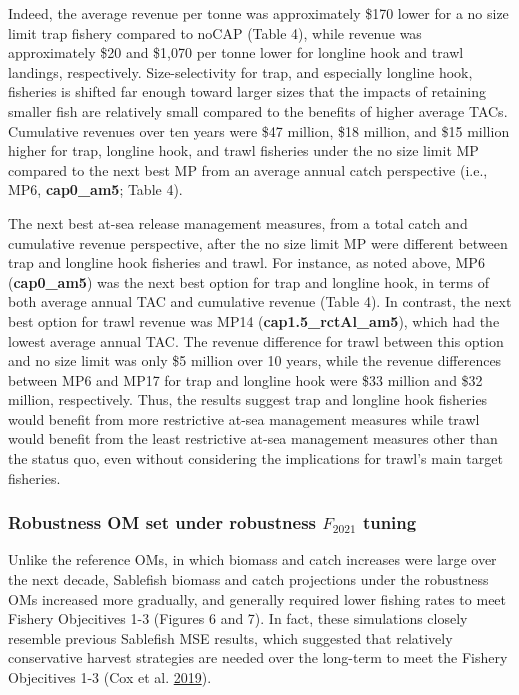 \documentclass[11pt]{book}
\begin{document}
Indeed, the average revenue per tonne was approximately \$170 lower for a no size limit trap fishery compared to noCAP (Table 4), while revenue was approximately \$20 and \$1,070 per tonne lower for longline hook and trawl landings, respectively. Size-selectivity for trap, and especially longline hook, fisheries is shifted far enough toward larger sizes that the impacts of retaining smaller fish are relatively small compared to the benefits of higher average TACs. Cumulative revenues over ten years were \$47 million, \$18 million, and \$15 million higher for trap, longline hook, and trawl fisheries under the no size limit MP compared to the next best MP from an average annual catch perspective (i.e., MP6, \textbf{cap0\_am5}; Table 4).

The next best at-sea release management measures, from a total catch and cumulative revenue perspective, after the no size limit MP were different between trap and longline hook fisheries and trawl. For instance, as noted above, MP6 (\textbf{cap0\_am5}) was the next best option for trap and longline hook, in terms of both average annual TAC and cumulative revenue (Table 4). In contrast, the next best option for trawl revenue was MP14 (\textbf{cap1.5\_rctAl\_am5}), which had the lowest average annual TAC. The revenue difference for trawl between this option and no size limit was only \$5 million over 10 years, while the revenue differences between MP6 and MP17 for trap and longline hook were \$33 million and \$32 million, respectively. Thus, the results suggest trap and longline hook fisheries would benefit from more restrictive at-sea management measures while trawl would benefit from the least restrictive at-sea management measures other than the status quo, even without considering the implications for trawl's main target fisheries.

\hypertarget{robustness-om-set-under-robustness-f_2021-tuning}{%
\subsubsection{\texorpdfstring{Robustness OM set under robustness \(F_{2021}\) tuning}{Robustness OM set under robustness F\_\{2021\} tuning}}\label{robustness-om-set-under-robustness-f_2021-tuning}}

Unlike the reference OMs, in which biomass and catch increases were large over the next decade, Sablefish biomass and catch projections under the robustness OMs increased more gradually, and generally required lower fishing rates to meet Fishery Objecitives 1-3 (Figures 6 and 7). In fact, these simulations closely resemble previous Sablefish MSE results, which suggested that relatively conservative harvest strategies are needed over the long-term to meet the Fishery Objecitives 1-3 (Cox et al. \protect\hyperlink{ref-cox2019evaluating}{2019}).
\end{document}
